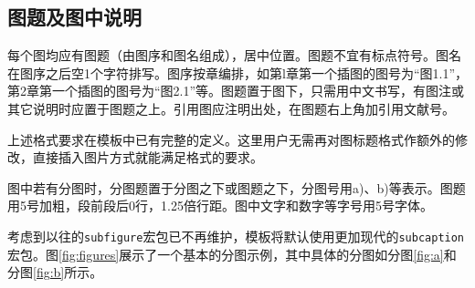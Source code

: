\subsection{图题及图中说明}

每个图均应有图题（由图序和图名组成），居中位置。图题不宜有标点符号。图名在图序之后空1个字符排写。图序按章编排，如第l章第一个插图的图号为“图1.1”，第2章第一个插图的图号为“图2.1”等。图题置于图下，只需用中文书写，有图注或其它说明时应置于图题之上。引用图应注明出处，在图题右上角加引用文献号。

上述格式要求在模板中已有完整的定义。这里用户无需再对图标题格式作额外的修改，直接插入图片方式就能满足格式的要求。

图中若有分图时，分图题置于分图之下或图题之下，分图号用a)、b)等表示。图题用5号加粗，段前段后0行，1.25倍行距。图中文字和数字等字号用5号字体。

考虑到以往的\texttt{subfigure}宏包已不再维护，模板将默认使用更加现代的\texttt{subcaption}宏包。图\ref{fig:figures}展示了一个基本的分图示例，其中具体的分图如分图\ref{fig:a}和分图\ref{fig:b}所示。

